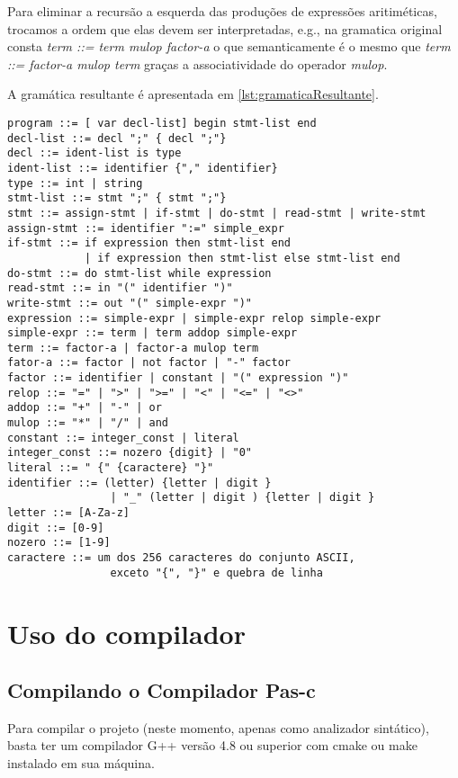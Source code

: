 \documentclass[11pt]{article}
\begin{document}
		Para eliminar a recursão a esquerda das produções de expressões aritiméticas, trocamos a ordem que elas devem
		ser interpretadas, e.g., na gramatica original consta \textit{term ::= term mulop factor-a} o que semanticamente
		é o mesmo que \textit{term ::= factor-a mulop term} graças a associatividade do operador \textit{mulop}.
		
		A gramática resultante é apresentada em \autoref{lst:gramaticaResultante}.
		\newpage
\begin{lstlisting}[label={lst:gramaticaResultante}, caption={Gramática alterada para implementação do parser recursivo}]
program ::= [ var decl-list] begin stmt-list end
decl-list ::= decl ";" { decl ";"}
decl ::= ident-list is type
ident-list ::= identifier {"," identifier}
type ::= int | string
stmt-list ::= stmt ";" { stmt ";"}
stmt ::= assign-stmt | if-stmt | do-stmt | read-stmt | write-stmt
assign-stmt ::= identifier ":=" simple_expr
if-stmt ::= if expression then stmt-list end 
			| if expression then stmt-list else stmt-list end
do-stmt ::= do stmt-list while expression
read-stmt ::= in "(" identifier ")"
write-stmt ::= out "(" simple-expr ")"
expression ::= simple-expr | simple-expr relop simple-expr
simple-expr ::= term | term addop simple-expr
term ::= factor-a | factor-a mulop term
fator-a ::= factor | not factor | "-" factor
factor ::= identifier | constant | "(" expression ")"
relop ::= "=" | ">" | ">=" | "<" | "<=" | "<>"
addop ::= "+" | "-" | or
mulop ::= "*" | "/" | and
constant ::= integer_const | literal
integer_const ::= nozero {digit} | "0"
literal ::= " {" {caractere} "}"
identifier ::= (letter) {letter | digit } 
				| "_" (letter | digit ) {letter | digit }
letter ::= [A-Za-z]
digit ::= [0-9]
nozero ::= [1-9]
caractere ::= um dos 256 caracteres do conjunto ASCII, 
				exceto "{", "}" e quebra de linha
\end{lstlisting}

\newpage
\section{Uso do compilador}

	
	\subsection{Compilando o Compilador Pas-c}

		Para compilar o projeto (neste momento, apenas como analizador sintático), basta ter um compilador G++ versão 4.8 
		ou superior com cmake ou make instalado em sua máquina.
		
\end{document}
